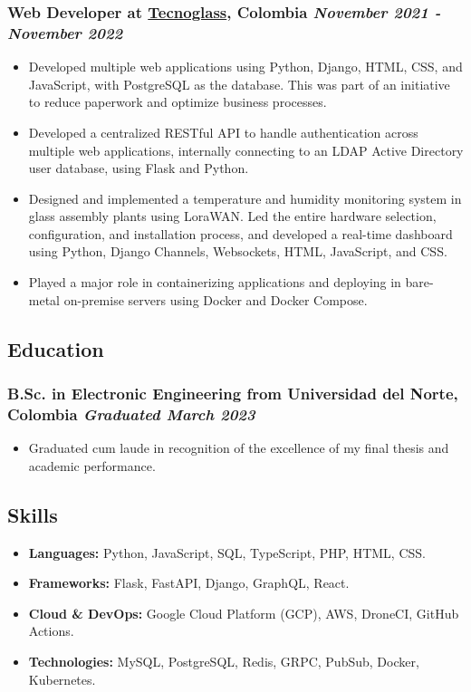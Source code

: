 \documentclass[a4paper,10pt]{article}
\begin{document}
\subsubsection*{%
  \textbf{Web Developer} at \href{https://www.tecnoglass.com/en/}{Tecnoglass}, Colombia
  \hfill
  \textit{November 2021 - November 2022}
}
\begin{itemize}
  \item Developed multiple web applications using Python, Django, HTML, CSS, and JavaScript, with PostgreSQL as the database.
    This was part of an initiative to reduce paperwork and optimize business processes.
    \item Developed a centralized RESTful API to handle authentication across multiple web applications, internally connecting to an
    LDAP Active Directory user database, using Flask and Python.
  \item Designed and implemented a temperature and humidity monitoring system in glass assembly plants using LoraWAN.
    Led the entire hardware selection, configuration, and installation process, and developed a real-time
    dashboard using Python, Django Channels, Websockets, HTML, JavaScript, and CSS.
  \item Played a major role in containerizing applications and deploying in bare-metal on-premise servers using Docker and Docker Compose.
\end{itemize}

\subsection*{Education}
\subsubsection*{\textbf{B.Sc. in Electronic Engineering} from Universidad del Norte, Colombia \hfill \textit{Graduated March 2023}}
\begin{itemize}
  \item Graduated cum laude in recognition of the excellence of my final thesis and academic performance.
\end{itemize}

\subsection*{Skills}
\begin{itemize}
  \item \textbf{Languages:} Python, JavaScript, SQL, TypeScript, PHP, HTML, CSS.
  \item \textbf{Frameworks:} Flask, FastAPI, Django, GraphQL, React.
  \item \textbf{Cloud \& DevOps:} Google Cloud Platform (GCP), AWS, DroneCI, GitHub Actions.
  \item \textbf{Technologies:} MySQL, PostgreSQL, Redis, GRPC, PubSub, Docker, Kubernetes.
\end{itemize}

\end{document}
